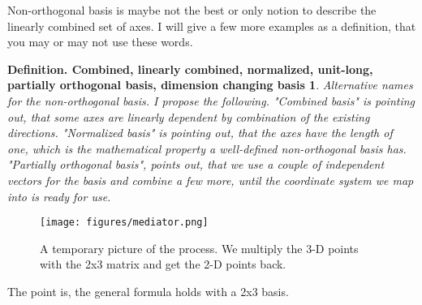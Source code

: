\documentclass[a4paper]{article}
\begin{document}
Non-orthogonal basis is maybe not the best or only notion to describe the linearly combined set of axes. I will give a few more examples as a definition, that you may or may not use these words.

\newtheorem{new_basis_terms}{Definition. Combined, linearly combined, normalized, unit-long, partially orthogonal basis, dimension changing basis}
\begin{new_basis_terms}
Alternative names for the non-orthogonal basis. I propose the following. "Combined basis"  is pointing out, that some axes
are linearly dependent by combination of the existing directions. "Normalized basis" is pointing out, that the axes have the length of one, which is the mathematical property a well-defined non-orthogonal basis has. "Partially orthogonal basis", points out, that we use a couple of independent vectors for the basis and combine a few more, until the coordinate system we map into is ready for use.
\end{new_basis_terms}




\begin{figure}
\texttt{[image: figures/mediator.png]}
\caption{A temporary picture of the process. We multiply the 3-D points with the 2x3 matrix and get the 2-D points back.}
\end{figure}

The point is, the general formula holds with a 2x3 basis.\\

\\
\end{document}
